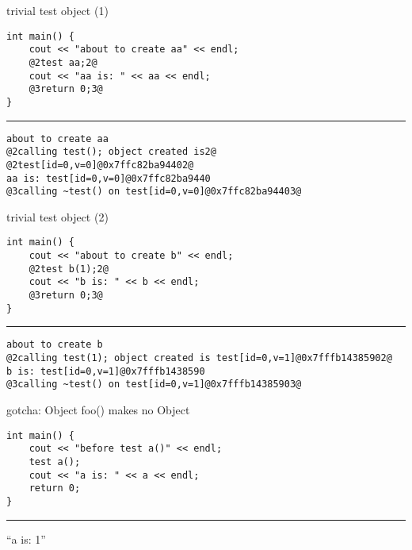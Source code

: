 \begin{frame}[fragile,label=testtrivial]{trivial test object (1)}
\begin{lstlisting}
int main() {
    cout << "about to create aa" << endl;
    @2test aa;2@
    cout << "aa is: " << aa << endl;
    @3return 0;3@
}
\end{lstlisting}
\hrule
\begin{lstlisting}
about to create aa
@2calling test(); object created is2@ @2test[id=0,v=0]@0x7ffc82ba94402@
aa is: test[id=0,v=0]@0x7ffc82ba9440
@3calling ~test() on test[id=0,v=0]@0x7ffc82ba94403@
\end{lstlisting}
\end{frame}

\begin{frame}[fragile,label=usingTest2]{trivial test object (2)}
\begin{lstlisting}
int main() {
    cout << "about to create b" << endl;
    @2test b(1);2@
    cout << "b is: " << b << endl;
    @3return 0;3@
}
\end{lstlisting}
\hrule
\begin{lstlisting}
about to create b
@2calling test(1); object created is test[id=0,v=1]@0x7fffb14385902@
b is: test[id=0,v=1]@0x7fffb1438590
@3calling ~test() on test[id=0,v=1]@0x7fffb14385903@
\end{lstlisting}
\end{frame}

\begin{frame}[fragile,label=gotcha]{gotcha: Object foo() makes no Object}
\begin{lstlisting}
int main() {
    cout << "before test a()" << endl;
    test a();
    cout << "a is: " << a << endl;
    return 0;
}
\end{lstlisting}
\hrule
``a is: 1''
\end{frame}


